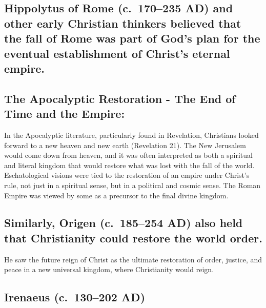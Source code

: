 \subsection{Hippolytus of Rome (c.~170--235 AD) and other early Christian thinkers believed that the fall of Rome was part of God's plan for the eventual establishment of Christ's eternal empire.}\label{par:hippolytus-of-rome-c.-170235-ad-and-other-early-christian-thinkers-believed-that-the-fall-of-rome-was-part-of-gods-plan-for-the-eventual-establishment-of-christs-eternal-empire.}

\subsection{The Apocalyptic Restoration - The End of Time and the Empire:}\label{par:the-apocalyptic-restoration---the-end-of-time-and-the-empire}

In the Apocalyptic literature, particularly found in Revelation, Christians looked forward to a new heaven and new earth (Revelation 21).
The New Jerusalem would come down from heaven, and it was often interpreted as both a spiritual and literal kingdom that would restore what was lost with the fall of the world.
Eschatological visions were tied to the restoration of an empire under Christ's rule, not just in a spiritual sense, but in a political and cosmic sense.
The Roman Empire was viewed by some as a precursor to the final divine kingdom.

\subsection{Similarly, Origen (c.~185--254 AD) also held that Christianity could restore the world order.}\label{par:similarly-origen-c.-185254-ad-also-held-that-christianity-could-restore-the-world-order.-he-saw-the-future-reign-of-christ-as-the-ultimate-restoration-of-order-justice-and-peace-in-a-new-universal-kingdom-where-christianity-would-reign.}

He saw the future reign of Christ as the ultimate restoration of order, justice, and peace in a new universal kingdom, where Christianity would reign.

\subsection{Irenaeus (c.~130--202 AD)}\label{par:irenaeus-c.-130202-ad---in-his-work-against-heresies-irenaeus-speaks-about-the-role-of-the-roman-empire-in-gods-providence-and-the-eventual-victory-of-christianity.-he-hints-at-a-future-unity-and-a-cosmic-victory-which-could-be-seen-as-the-restoration-of-the-world-through-christs-reign.}

